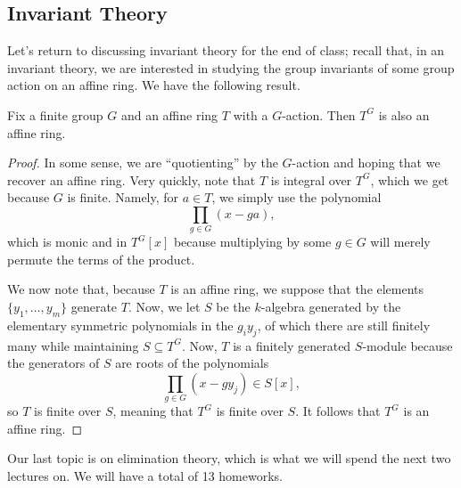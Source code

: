 \subsection{Invariant Theory}
Let's return to discussing invariant theory for the end of class; recall that, in an invariant theory, we are interested in studying the group invariants of some group action on an affine ring. We have the following result.
\begin{theorem}
	Fix a finite group $G$ and an affine ring $T$ with a $G$-action. Then $T^G$ is also an affine ring.
\end{theorem}
\begin{proof}
	In some sense, we are ``quotienting'' by the $G$-action and hoping that we recover an affine ring. Very quickly, note that $T$ is integral over $T^G$, which we get because $G$ is finite. Namely, for $a\in T$, we simply use the polynomial
	\[\prod_{g\in G}(x-ga),\]
	which is monic and in $T^G[x]$ because multiplying by some $g\in G$ will merely permute the terms of the product.

	We now note that, because $T$ is an affine ring, we suppose that the elements $\{y_1,\ldots,y_m\}$ generate $T$. Now, we let $S$ be the $k$-algebra generated by the elementary symmetric polynomials in the $g_iy_j$, of which there are still finitely many while maintaining $S\subseteq T^G$. Now, $T$ is a finitely generated $S$-module because the generators of $S$ are roots of the polynomials
	\[\prod_{g\in G}(x-gy_j)\in S[x],\]
	so $T$ is finite over $S$, meaning that $T^G$ is finite over $S$. It follows that $T^G$ is an affine ring.
\end{proof}
Our last topic is on elimination theory, which is what we will spend the next two lectures on. We will have a total of 13 homeworks.